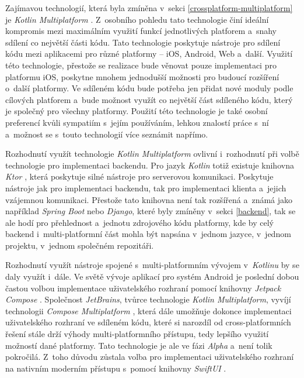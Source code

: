 Zajímavou technologií, která byla zmíněna v~sekci \ref{crossplatform-multiplatform} je \emph{Kotlin Multiplatform} \cite{kotlin-multiplatform}. Z~osobního pohledu tato technologie činí ideální kompromis mezi maximálním využití funkcí jednotlivých platforem a~snahy sdílení co největší části kódu. Tato technologie poskytuje nástroje pro sdílení kódu mezi aplikacemi pro různé platformy – iOS, Android, Web a~další. Využití této technologie, přestože se realizace bude věnovat pouze implementaci pro platformu iOS, poskytne mnohem jednodušší možnosti pro budoucí rozšíření o~další platformy. Ve sdíleném kódu bude potřeba jen přidat nové moduly podle cílových platforem a~bude možnost využít co největší část sdíleného kódu, který je společný pro všechny platformy. Použití této technologie je také osobní preferencí kvůli sympatiím s~jejím používáním, lehkou znalostí práce s~ní a~možnost se s~touto technologií více seznámit napřímo.

Rozhodnutí využít technologie \emph{Kotlin Multiplatform} ovlivní i~rozhodnutí při volbě technologie pro implementaci backendu. Pro jazyk \emph{Kotlin} totiž existuje knihovna \emph{Ktor} \cite{ktor}, která poskytuje silné nástroje pro serverovou komunikaci. Poskytuje nástroje jak pro implementaci backendu, tak pro implementaci klienta a~jejich vzájemnou komunikaci. Přestože tato knihovna není tak rozšířená a~známá jako například \emph{Spring Boot} nebo \emph{Django}, které byly zmíněny v~sekci \ref{backend}, tak se ale hodí pro přehlednost a~jednotu zdrojového kódu platformy, kde by celý backend i~multi-platformní část mohla být napsána v~jednom jazyce, v~jednom projektu, v~jednom společném repozitáři.

Rozhodnutí využít nástroje spojené s~multi-platformním vývojem v~\emph{Kotlinu} by se daly využít i~dále. Ve světě vývoje aplikací pro systém Android je poslední dobou častou volbou implementace uživatelského rozhraní pomocí knihovny \emph{Jetpack Compose} \cite{compose-ui}. Společnost \emph{JetBrains}, tvůrce technologie \emph{Kotlin Multiplatform}, vyvíjí technologii \emph{Compose Multiplatform} \cite{compose-multiplatform}, která dále umožňuje dokonce implementaci uživatelského rozhraní ve sdíleném kódu, které si narozdíl od cross-platformních řešení stále drží výhody multi-platformního přístupu, tedy lepšího využití možností dané platformy. Tato technologie je ale ve fázi \emph{Alpha} a~není tolik pokročilá. Z~toho důvodu zůstala volba pro implementaci uživatelského rozhraní na nativním moderním přístupu s~pomocí knihovny \emph{SwiftUI} \cite{swiftui}.

